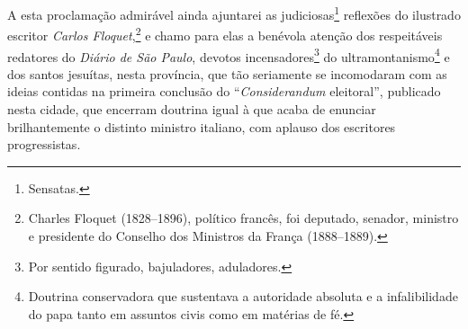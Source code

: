 A esta proclamação admirável ainda ajuntarei as judiciosas\footnote{
  Sensatas.} reflexões do ilustrado escritor \emph{Carlos
Floquet},\footnote{Charles Floquet (1828--1896), político francês, foi
  deputado, senador, ministro e presidente do Conselho dos Ministros da
  França (1888--1889).} e chamo para elas a benévola atenção dos
respeitáveis redatores do \emph{Diário de São Paulo}, devotos
incensadores\footnote{Por sentido figurado, bajuladores, aduladores.}
do ultramontanismo\footnote{Doutrina conservadora que sustentava a
  autoridade absoluta e a infalibilidade do papa tanto em assuntos civis
  como em matérias de fé.}\label{ultramontano} e dos santos jesuítas, nesta província, que
tão seriamente se incomodaram com as ideias contidas na primeira
conclusão do ``\emph{Considerandum} eleitoral'', publicado nesta cidade, que
encerram doutrina igual à que acaba de enunciar brilhantemente o
distinto ministro italiano, com aplauso dos escritores progressistas.

